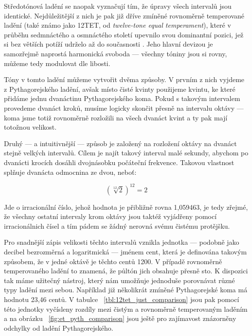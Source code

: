 \documentclass[12pt]{article}
\begin{document}
Středotónová ladění se naopak vyznačují tím, že úpravy všech intervalů jsou identické. Nejdůležitější z nich je pak již dříve zmíněné rovnoměrně temperované ladění (také známo jako 12TET, od \emph{twelve-tone equal temperament}), které v průběhu sedmnáctého a osmnáctého století upevnilo svou dominantní pozici, jež si bez větších potíží udrželo až do současnosti \cite{smolka}. Jeho hlavní devizou je samozřejmě naprostá harmonická svoboda — všechny tóniny jsou si rovny, můžeme tedy modulovat dle libosti.

Tóny v tomto ladění můžeme vytvořit dvěma způsoby. V prvním z nich vyjdeme z Pythagorejského ladění, avšak místo čisté kvinty použijeme kvintu, ke které přidáme jednu dvanáctinu Pythagorejského koma. Pokud s takovým intervalem provedeme dvanáct kroků, musíme logicky skončit přesně na intervalu oktávy — koma jsme totiž rovnoměrně rozložili na všech dvanáct kvint a ty pak mají totožnou velikost.

Druhý — a intuitivnější — způsob je založený na rozložení oktávy na dvanáct stejně velkých intervalů. Cílem je najít takový interval malé sekundy, abychom po dvanácti krocích dosáhli dvojnásobku počáteční frekvence. Takovou vlastnost splňuje dvanácta odmocnina ze dvou, neboť:

\begin{equation}
(\sqrt[12]{2})^{12} = 2
\end{equation}

Jde o irracionální číslo, jehož hodnota je přibližně rovna 1,059463, je tedy zřejmé, že všechny ostatní intervaly krom oktávy jsou taktéž vyjádřeny pomocí irracionálnich čísel a tím pádem se žádný nerovná svému čistému protějšku.

Pro snadnější zápis velikosti těchto intervalů vznikla jednotka — podobně jako decibel bezrozměrná a logaritmická — jménem cent, která je definována takovým způsobem, že v jedné oktávě je těchto centů 1200. V případě rovnoměrně temperovaného ladění to znamená, že půltón jich obsahuje přesně sto. K dispozici tak máme užitečný nástroj, který nám umožňuje jednoduše porovnávat různé typy ladění mezi sebou. Například již několikrát zmíněné Pythagorejské koma má hodnotu 23,46 centů. V tabulce ~\ref{tbl:12tet_just_comparison} jsou pak pomocí této jednotky vyčísleny rozdíly mezi čistým a rovnoměrně temperovaným laděním a na obrázku ~\ref{fig:et_pyth_comparison} jsou ještě pro zajímavost znázorněny odchylky od ladění Pythagorejského.
\end{document}
